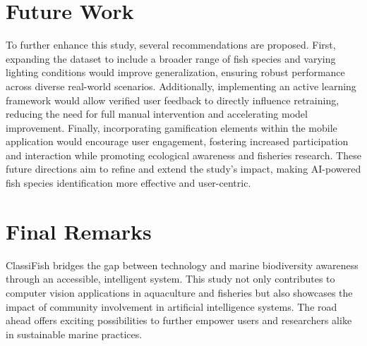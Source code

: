 \section{Future Work}
To further enhance this study, several recommendations are proposed. First, expanding the dataset to include a broader range of fish species and varying lighting conditions would improve generalization, ensuring robust performance across diverse real-world scenarios. Additionally, implementing an active learning framework would allow verified user feedback to directly influence retraining, reducing the need for full manual intervention and accelerating model improvement. Finally, incorporating gamification elements within the mobile application would encourage user engagement, fostering increased participation and interaction while promoting ecological awareness and fisheries research. These future directions aim to refine and extend the study’s impact, making AI-powered fish species identification more effective and user-centric.

\section{Final Remarks}
ClassiFish bridges the gap between technology and marine biodiversity awareness through an accessible, intelligent system. This study not only contributes to computer vision applications in aquaculture and fisheries but also showcases the impact of community involvement in artificial intelligence systems. The road ahead offers exciting possibilities to further empower users and researchers alike in sustainable marine practices.